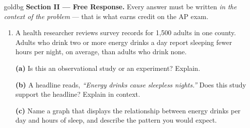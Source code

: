 \documentclass[12pt]{article}
\begin{document}
\vspace{0.08in}

\boxguard[27]
\begin{headlinebox}{goldbg}
\small
\textbf{Section II --- Free Response.} Every answer must be written \emph{in the context of the
problem} --- that is what earns credit on the AP exam.
\end{headlinebox}

\vspace{0.06in}

\begin{enumerate}[leftmargin=1.9em, itemsep=0.10in, resume]

  \item A health researcher reviews survey records for 1{,}500 adults in one county. Adults who
        drink two or more energy drinks a day report sleeping fewer hours per night, on average,
        than adults who drink none.

        \vspace{6pt}

        \boxguard[16]
        \textbf{(a)} Is this an observational study or an experiment? Explain.\\[4pt]

        \vspace{4pt}
        \boxguard[16]
        \textbf{(b)} A headline reads, \emph{``Energy drinks cause sleepless nights.''} Does this
        study support the headline? Explain in context.\\[4pt]

        \vspace{4pt}
        \boxguard[16]
        \textbf{(c)} Name a graph that displays the relationship between energy drinks per day and
        hours of sleep, and describe the pattern you would expect.\\[4pt]

\end{enumerate}
\end{document}
